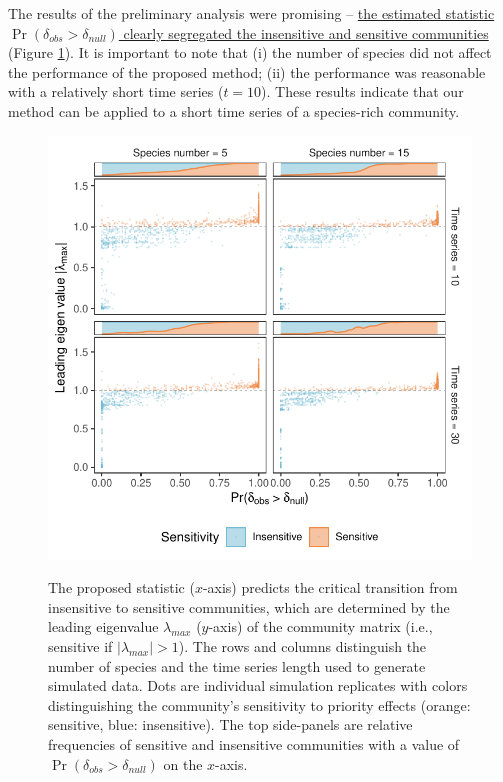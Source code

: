 \documentclass[12pt, class=article, crop=false]{standalone}
\begin{document}
The results of the preliminary analysis were promising -- \ul{the estimated statistic $\Pr(\delta_{obs} > \delta_{null})$ clearly segregated the insensitive and sensitive communities} (Figure \ref{fig:box}). It is important to note that (i) the number of species did not affect the performance of the proposed method; (ii) the performance was reasonable with a relatively short time series ($t = 10$).
These results indicate that our method can be applied to a short time series of a species-rich community. 

\begin{figure}
    \caption{The proposed statistic ($x$-axis) predicts the critical transition from insensitive to sensitive communities, which are determined by the leading eigenvalue $\lambda_{max}$ ($y$-axis) of the community matrix (i.e., sensitive if $|\lambda_{max}| > 1$).
    The rows and columns distinguish the number of species and the time series length used to generate simulated data.
    Dots are individual simulation replicates with colors distinguishing the community's sensitivity to priority effects (orange: sensitive, blue: insensitive).
    The top side-panels are relative frequencies of sensitive and insensitive communities with a value of $\Pr(\delta_{obs} > \delta_{null})$ on the $x$-axis.}
    \includegraphics[scale=0.7]{output/figure_eigen_scatter.pdf}
    \label{fig:box}
\end{figure}
\end{document}
